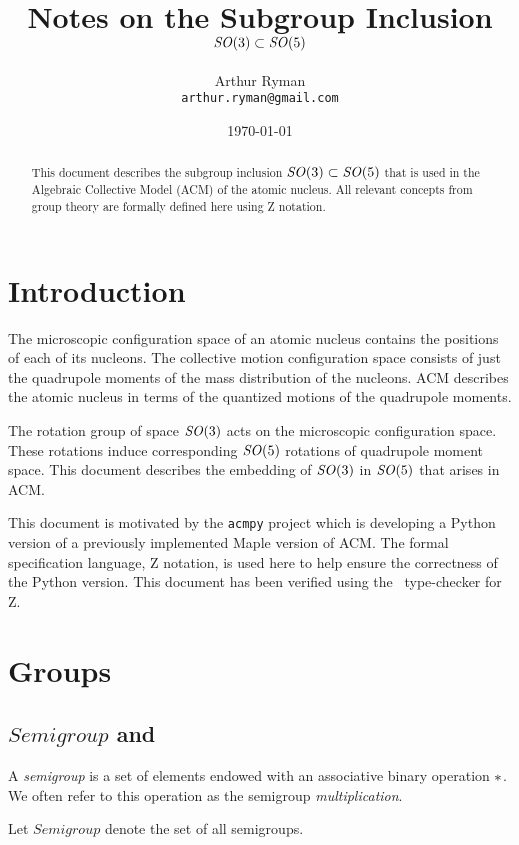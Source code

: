 \documentclass[12pt]{article}
\title{Notes on the Subgroup Inclusion $\mathit{SO}(3) \subset \mathit{SO}(5)$}
\author{
    Arthur Ryman\\
    \texttt{arthur.ryman@gmail.com}
}
\date{\today}
\begin{document}
    \maketitle

    \begin{abstract}
        This document describes the subgroup inclusion $\mathit{SO}(3) \subset \mathit{SO}(5)$
        that is used in the Algebraic Collective Model (ACM) of the atomic nucleus.
        All relevant concepts from group theory are formally defined here using Z notation.
    \end{abstract}

\section{Introduction}

The microscopic configuration space of an atomic nucleus contains the positions of each of its nucleons.
The collective motion configuration space consists of just the quadrupole moments of the mass distribution
of the nucleons.
ACM describes the atomic nucleus in terms of the quantized motions of the quadrupole moments. 

The rotation group of space $\mathit{SO}(3)$ acts on the microscopic configuration space.
These rotations induce corresponding $\mathit{SO}(5)$ rotations of quadrupole moment space.
This document describes the embedding of $\mathit{SO}(3)$ in $\mathit{SO}(5)$ that arises in ACM.

This document is motivated by the \texttt{acmpy} project which is developing a Python version
of a previously implemented Maple version of ACM.
The formal specification language, Z notation, is used here to help ensure the correctness of the Python version.
This document has been verified using the \fuzz\ type-checker for Z.

\section{Groups}

\subsection{$Semigroup$ and }

A {\em semigroup} is a set of elements endowed with an associative binary operation $\mathbin{*}$.
We often refer to this operation as the semigroup {\em multiplication}.

Let $Semigroup$ denote the set of all semigroups.
\end{document}
